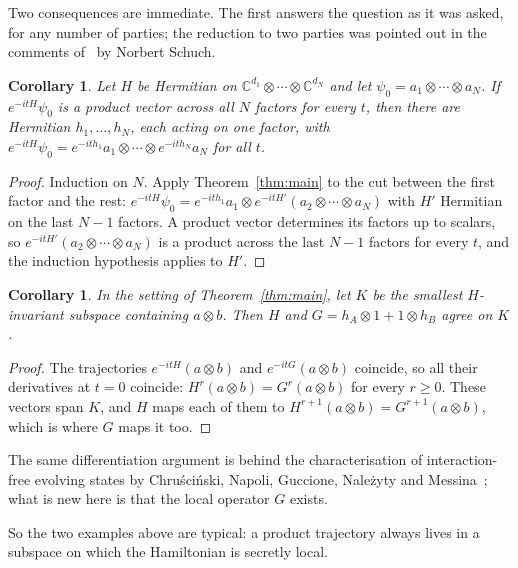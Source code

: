 \documentclass[11pt]{article}
\newtheorem{corollary}[theorem]{Corollary}
\theoremstyle{remark}
\newcommand{\C}{\mathbb{C}}
\begin{document}
Two consequences are immediate. The first answers the question as it was asked, for any number
of parties; the reduction to two parties was pointed out in the comments of~\cite{SE816017} by
Norbert Schuch.

\begin{corollary}\label{cor:multi}
Let $H$ be Hermitian on $\C^{d_1}\otimes\cdots\otimes\C^{d_N}$ and let $\psi_0=a_1\otimes\cdots
\otimes a_N$. If $e^{-itH}\psi_0$ is a product vector across all $N$ factors for every $t$,
then there are Hermitian $h_1,\dots,h_N$, each acting on one factor, with $e^{-itH}\psi_0=
e^{-ith_1}a_1\otimes\cdots\otimes e^{-ith_N}a_N$ for all $t$.
\end{corollary}

\begin{proof}
Induction on $N$. Apply Theorem~\ref{thm:main} to the cut between the first factor and the
rest: $e^{-itH}\psi_0=e^{-ith_1}a_1\otimes e^{-itH'}(a_2\otimes\cdots\otimes a_N)$ with $H'$
Hermitian on the last $N-1$ factors. A product vector determines its factors up to scalars,
so $e^{-itH'}(a_2\otimes\cdots\otimes a_N)$ is a product across the last $N-1$ factors for
every $t$, and the induction hypothesis applies to $H'$.
\end{proof}

\begin{corollary}\label{cor:cyclic}
In the setting of Theorem~\ref{thm:main}, let $K$ be the smallest $H$-invariant subspace
containing $a\otimes b$. Then $H$ and $G=h_A\otimes 1+1\otimes h_B$ agree on $K$.
\end{corollary}

\begin{proof}
The trajectories $e^{-itH}(a\otimes b)$ and $e^{-itG}(a\otimes b)$ coincide, so all their
derivatives at $t=0$ coincide: $H^r(a\otimes b)=G^r(a\otimes b)$ for every $r\ge0$. These
vectors span $K$, and $H$ maps each of them to $H^{r+1}(a\otimes b)=G^{r+1}(a\otimes b)$,
which is where $G$ maps it too.
\end{proof}

The same differentiation argument is behind the characterisation of interaction-free evolving
states by Chru\'sci\'nski, Napoli, Guccione, Nale\.zyty and Messina~\cite[Theorem~1]{CNGNM15};
what is new here is that the local operator $G$ exists.

So the two examples above are typical: a product trajectory always lives in a subspace on
which the Hamiltonian is secretly local.
\end{document}
